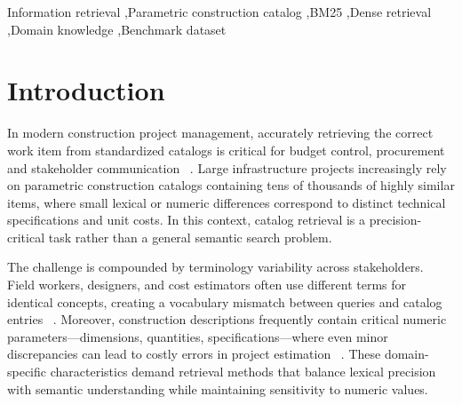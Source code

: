 \documentclass[preprint,review,12pt]{elsarticle}
\begin{document}
\begin{frontmatter}
\begin{abstract}
Dense embeddings therefore localize a query within the catalog but do not preserve the
parametric distinctions that carry cost implications. BC3CAT, its query sets,
every run's configuration and metrics, and per-query outputs of the principal systems
are released.

\end{abstract}

\begin{keyword}
Information retrieval \sep Parametric construction catalog \sep BM25 \sep Dense retrieval \sep Domain knowledge \sep Benchmark dataset
\end{keyword}

\end{frontmatter}


\section{Introduction}
\label{sec:introduction}
In modern construction project management, accurately retrieving the correct work item from standardized catalogs  is critical for budget control, procurement and stakeholder communication ~\cite{martinez-rojasApproachAutomaticClassification2015, wuNaturalLanguageProcessing2022}. Large infrastructure projects increasingly rely on parametric construction catalogs containing tens of thousands of highly similar items, where small lexical or numeric differences correspond to distinct technical specifications and unit costs. In this context, catalog retrieval is a precision-critical task rather than a general semantic search problem.

The challenge is compounded by terminology variability across stakeholders. Field workers, designers, and cost estimators often use different terms for identical concepts, creating a vocabulary mismatch between queries and catalog entries  ~\cite{chungComparingNaturalLanguage2023, role_martnezrojas_2016, rampiniArtificialIntelligenceConstruction2022, casiniAdvancedSiteManagement2022}. Moreover, construction descriptions frequently contain critical numeric parameters—dimensions, quantities, specifications—where even minor discrepancies can lead to costly errors in project estimation ~\cite{wuNaturalLanguageProcessing2022}. These domain-specific characteristics demand retrieval methods that balance lexical precision with semantic understanding while maintaining sensitivity to numeric values.
\end{document}
